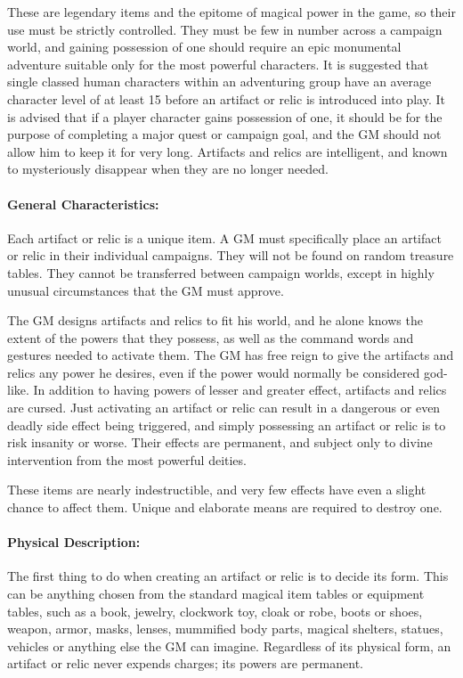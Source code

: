 \begin{multicols}{2}
These are legendary items and the epitome of magical power in the game, so their use must be strictly controlled.  They must be few in number across a campaign world, and gaining possession of one should require an epic monumental adventure suitable only for the most powerful characters.  It is suggested that single classed human characters within an adventuring group have an average character level of at least 15 before an artifact or relic is introduced into play.  It is advised that if a player character gains possession of one, it should be for the purpose of completing a major quest or campaign goal, and the GM should not allow him to keep it for very long.  Artifacts and relics are intelligent, and known to mysteriously disappear when they are no longer needed.

\paragraph{General Characteristics:} Each artifact or relic is a unique item.  A GM must specifically place an artifact or relic in their individual campaigns.  They will not be found on random treasure tables.  They cannot be transferred between campaign worlds, except in highly unusual circumstances that the GM must approve.

The GM designs artifacts and relics to fit his world, and he alone knows the extent of the powers that they possess, as well as the command words and gestures needed to activate them.  The GM has free reign to give the artifacts and relics any power he desires, even if the power would normally be considered god-like.  In addition to having powers of lesser and greater effect, artifacts and relics are cursed.  Just activating an artifact or relic can result in a dangerous or even deadly side effect being triggered, and simply possessing an artifact or relic is to risk insanity or worse.  Their effects are permanent, and subject only to divine intervention from the most powerful deities.

These items are nearly indestructible, and very few effects have even a slight chance to affect them.  Unique and elaborate means are required to destroy one.

\paragraph{Physical Description:} The first thing to do when creating an artifact or relic is to decide its form.  This can be anything chosen from the standard magical item tables or equipment tables, such as a book, jewelry, clockwork toy, cloak or robe, boots or shoes, weapon, armor, masks, lenses, mummified body parts, magical shelters, statues, vehicles or anything else the GM can imagine.  Regardless of its physical form, an artifact or relic never expends charges; its powers are permanent.


\end{multicols}
